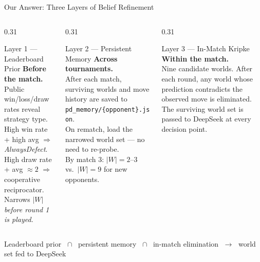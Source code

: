 \documentclass[aspectratio=169, 10pt]{beamer}
\begin{document}
\begin{frame}{Our Answer: Three Layers of Belief Refinement}

    \begin{columns}[T]
        \begin{column}{0.31\textwidth}
            \begin{block}{Layer 1 --- Leaderboard Prior}
                \textbf{Before the match.}\\[6pt]
                Public win/loss/draw rates reveal strategy type.\\[4pt]
                High win rate + high avg $\Rightarrow$ \textit{AlwaysDefect}.\\
                High draw rate + avg $\approx 2$ $\Rightarrow$ cooperative reciprocator.\\[6pt]
                Narrows $|W|$ \textit{before round 1 is played.}
            \end{block}
        \end{column}
        \begin{column}{0.31\textwidth}
            \begin{block}{Layer 2 --- Persistent Memory}
                \textbf{Across tournaments.}\\[6pt]
                After each match, surviving worlds and move history are saved to
                \texttt{pd\_memory/\{opponent\}.json}.\\[4pt]
                On rematch, load the narrowed world set --- no need to re-probe.\\[6pt]
                By match 3: $|W| = 2$--$3$ vs.\ $|W| = 9$ for new opponents.
            \end{block}
        \end{column}
        \begin{column}{0.31\textwidth}
            \begin{block}{Layer 3 --- In-Match Kripke}
                \textbf{Within the match.}\\[6pt]
                Nine candidate worlds. After each round, any world whose prediction
                contradicts the observed move is eliminated.\\[4pt]
                The surviving world set is passed to DeepSeek at every decision point.
            \end{block}
        \end{column}
    \end{columns}

    \vspace{0.35cm}
    \begin{center}
        \textcolor{secondary}{\small
        Leaderboard prior $\;\cap\;$ persistent memory $\;\cap\;$ in-match elimination
        $\;\longrightarrow\;$ world set fed to DeepSeek}
    \end{center}
\end{frame}
\end{document}
